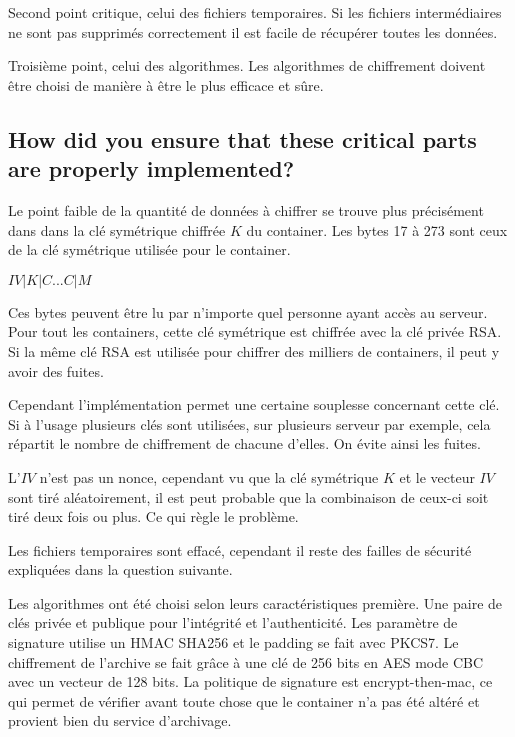 \documentclass[a4paper]{report}
\begin{document}
Second point critique, celui des fichiers temporaires. Si les fichiers intermédiaires ne sont pas supprimés correctement il est facile de récupérer toutes les données.

Troisième point, celui des algorithmes. Les algorithmes de chiffrement doivent être choisi de manière à être le plus efficace et sûre.

\subsection{How did you ensure that these critical parts are properly implemented?}
Le point faible de la quantité de données à chiffrer se trouve plus précisément dans dans la clé symétrique chiffrée $K$ du container. Les bytes 17 à 273 sont ceux de la clé symétrique utilisée pour le container.

\begin{center}
$IV|K|C...C|M$
\end{center}

Ces bytes peuvent être lu par n'importe quel personne ayant accès au serveur. Pour tout les containers, cette clé symétrique est chiffrée avec la clé privée RSA. Si la même clé RSA est utilisée pour chiffrer des milliers de containers, il peut y avoir des fuites.

Cependant l'implémentation permet une certaine souplesse concernant cette clé. Si à l'usage plusieurs clés sont utilisées, sur plusieurs serveur par exemple, cela répartit le nombre de chiffrement de chacune d'elles. On évite ainsi les fuites.

L'$IV$ n'est pas un nonce, cependant vu que la clé symétrique $K$ et le vecteur $IV$ sont tiré aléatoirement, il est peut probable que la combinaison de ceux-ci soit tiré deux fois ou plus. Ce qui règle le problème.

Les fichiers temporaires sont effacé, cependant il reste des failles de sécurité expliquées dans la question suivante.

Les algorithmes ont été choisi selon leurs caractéristiques première. Une paire de clés privée et publique pour l'intégrité et l'authenticité. Les paramètre de signature utilise un HMAC SHA256 et le padding se fait avec PKCS7. Le chiffrement de l'archive se fait grâce à une clé de 256 bits en AES mode CBC avec un vecteur de 128 bits. La politique de signature est encrypt-then-mac, ce qui permet de vérifier avant toute chose que le container n'a pas été altéré et provient bien du service d'archivage.
\end{document}
